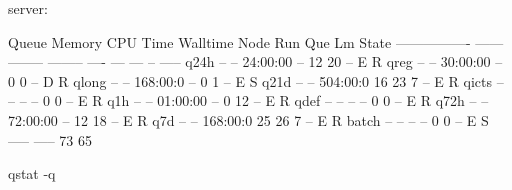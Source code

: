 \begin{prompt}
server: %

Queue            Memory CPU Time Walltime Node  Run Que Lm  State
---------------- ------ -------- -------- ----  --- --- --  -----
q24h               --      --    24:00:00   --   12  20 --   E R
qreg               --      --    30:00:00   --    0   0 --   D R
qlong              --      --    168:00:0   --    0   1 --   E S
q21d               --      --    504:00:0    16  23   7 --   E R
qicts              --      --       --      --    0   0 --   E R
q1h                --      --    01:00:00   --    0  12 --   E R
qdef               --      --       --      --    0   0 --   E R
q72h               --      --    72:00:00   --   12  18 --   E R
q7d                --      --    168:00:0    25  26   7 --   E R
batch              --      --       --      --    0   0 --   E S
                                               ----- -----
                                                  73    65

\end{prompt}qstat -q

